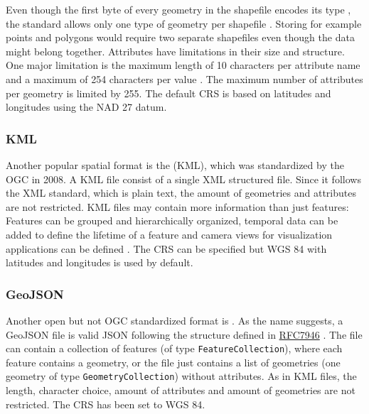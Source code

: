 			Even though the first byte of every geometry in the shapefile encodes its type \cite[4-23]{esri-shapefile-spec}, the standard allows only one type of geometry per shapefile \cite[4]{esri-shapefile-spec}.
			Storing for example points and polygons would require two separate shapefiles even though the data might belong together.
			Attributes have limitations in their size and structure.
			One major limitation is the maximum length of 10 characters per attribute name and a maximum of 254 characters per value \cite{esri-shapefile-limitations}.
			The maximum number of attributes per geometry is limited by 255.
			The default CRS is based on latitudes and longitudes using the NAD 27 datum\cite{esri-shapefile-coordinate-system}.
			
		\subsubsection{KML}
		
			Another popular spatial format is the  (KML), which was standardized by the OGC in 2008\cite{ogc-kml-2.2}.
			A KML file consist of a single XML structured file.
			Since it follows the XML standard, which is plain text, the amount of geometries and attributes are not restricted.
			KML files may contain more information than just features:
			Features can be grouped and hierarchically organized, temporal data can be added to define the lifetime of a feature and camera views for visualization applications can be defined \cite{ogc-kml-2.3}.
			The CRS can be specified but WGS 84 with latitudes and longitudes is used by default.
		
		\subsubsection{GeoJSON}
		\label{subsubsec:geojson}
		
			Another open but not OGC standardized format is .
			As the name suggests, a GeoJSON file is valid JSON following the structure defined in \href{https://datatracker.ietf.org/doc/html/rfc7946}{RFC7946} \cite{ietf-geojson}.
			The file can contain a collection of features (of type \texttt{FeatureCollection}), where each feature contains a geometry, or the file just contains a list of geometries (one geometry of type \texttt{GeometryCollection}) without attributes.
			As in KML files, the length, character choice, amount of attributes and amount of geometries are not restricted.
			The CRS has been set to WGS 84.
			
